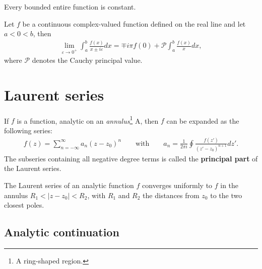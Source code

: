     \begin{theorem}[Liouville]
        Every bounded entire function is constant.
    \end{theorem}

    \begin{theorem}\label{complexcalculus:sokhotski_plemelj}
        Let $f$ be a continuous complex-valued function defined on the real line and let $a<0<b$, then
        \begin{gather}
            \lim_{\varepsilon\rightarrow0^+}\int_a^b\frac{f(x)}{x\pm i\varepsilon}dx = \mp i\pi f(0) + \mathcal{P}\int_a^b\frac{f(x)}{x}dx,
        \end{gather}
        where $\mathcal{P}$ denotes the Cauchy principal value.
    \end{theorem}

\section{Laurent series}

    \begin{definition}\label{complexcalculus:laurent_series}
        If $f$ is a function, analytic on an \textit{annulus}\footnote{A ring-shaped region.} A, then $f$ can be expanded as the following series:
        \begin{gather}
            f(z) = \sum^{\infty}_{n=-\infty} a_n (z - z_0)^n \qquad \text{with} \qquad a_n = \frac{1}{2\pi i} \oint \frac{f(z')}{(z' - z_0)^{n+1}} dz'.
        \end{gather}
        The subseries containing all negative degree terms is called the \textbf{principal part} of the Laurent series.
    \end{definition}

    \begin{property}
        The Laurent series of an analytic function $f$ converges uniformly to $f$ in the annulus $R_1 < |z - z_0| < R_2$, with $R_1$ and $R_2$ the distances from $z_0$ to the two closest poles.
    \end{property}

\subsection{Analytic continuation}

